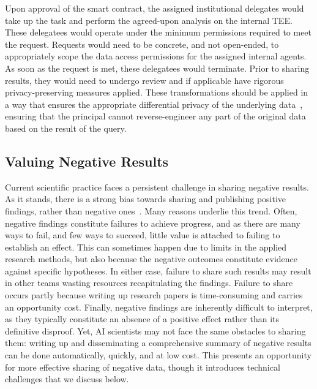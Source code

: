 \documentclass[11pt, a4paper, twocolumn, goog]{google}
\begin{document}
Upon approval of the smart contract, the assigned institutional delegates would take up the task and perform the agreed-upon analysis on the internal TEE. These delegatees would operate under the minimum permissions required to meet the request. Requests would need to be concrete, and not open-ended, to appropriately scope the data access permissions for the assigned internal agents. As soon as the request is met, these delegatees would terminate. Prior to sharing results, they would need to undergo review and if applicable have rigorous privacy-preserving measures applied. These transformations should be applied in a way that ensures the appropriate differential privacy of the underlying data~\citep{dwork2008differential}, ensuring that the principal cannot reverse-engineer any part of the original data based on the result of the query.

\subsection{Valuing Negative Results}

Current scientific practice faces a persistent challenge in sharing negative results. As it stands, there is a strong bias towards sharing and publishing positive findings, rather than negative ones~\citep{callaham1998positive, dirnagl2010fighting, mlinaric2017dealing, heesen2025publication}. Many reasons underlie this trend. Often, negative findings constitute failures to achieve progress, and as there are many ways to fail, and few ways to succeed, little value is attached to failing to establish an effect. This can sometimes happen due to limits in the applied research methods, but also because the negative outcomes constitute evidence against specific hypotheses. In either case, failure to share such results may result in other teams wasting resources recapitulating the findings. Failure to share occurs partly because writing up research papers is time-consuming and carries an opportunity cost. Finally, negative findings are inherently difficult to interpret, as they typically constitute an absence of a positive effect rather than its definitive disproof. Yet, AI scientists may not face the same obstacles to sharing them: writing up and disseminating a comprehensive summary of negative results can be done automatically, quickly, and at low cost. This presents an opportunity for more effective sharing of negative data, though it introduces technical challenges that we discuss below.
\end{document}
